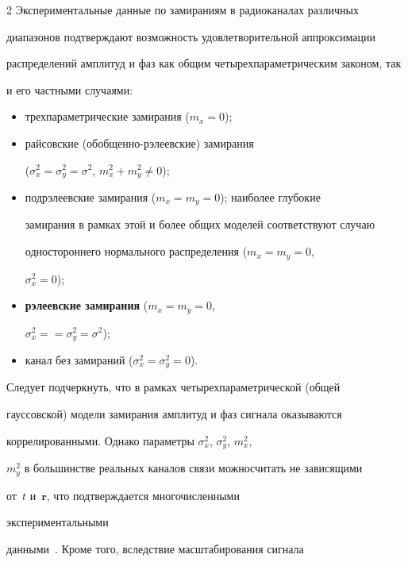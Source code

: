 \begin{multicols}{2}
     Экспериментальные данные по замираниям в радиоканалах различных 


диапазонов подтверждают возможность удовлетворительной аппроксимации 


распределений амплитуд и фаз как общим четырехпараметрическим законом, так 


и его частными случаями:


     \begin{itemize}


\item трехпараметрические замирания ($m_x=0$);


\item райсовские (обобщенно-рэлеевские) замирания 


($\sigma_x^2=\sigma_y^2=\sigma^2$, $m_x^2+m_y^2\not=0$);


\item подрэлеевские замирания ($m_x=m_y=0$); наиболее глубокие 


замирания в рамках этой и более общих моделей соответствуют случаю 


одностороннего нормального распределения ($m_x=m_y=0$, 


$\sigma_x^2=0$);


\item \textbf{рэлеевские замирания} ($m_x=m_y=0$, 


$\sigma_x^2=$\linebreak $=\sigma_y^2=\sigma^2$);


\item канал без замираний ($\sigma_x^2=\sigma_y^2=0$).


     \end{itemize}


     


     Следует подчеркнуть, что в рамках четырехпараметрической (общей 


гауссовской) модели замирания амплитуд и фаз сигнала оказываются 


коррелированными. Однако параметры $\sigma_x^2$, $\sigma_y^2$, $m_x^2$, 


$m_y^2$ в большинстве реальных каналов связи можно\linebreak считать не зависящими 


от~$t$ и~$\mathbf{r}$, что под\-тверж\-дается многочисленными 


экспериментальными 


     данными~\cite{3-pr, 5-pr}. Кроме того, вследствие масштабирования сигнала 



\end{multicols}
